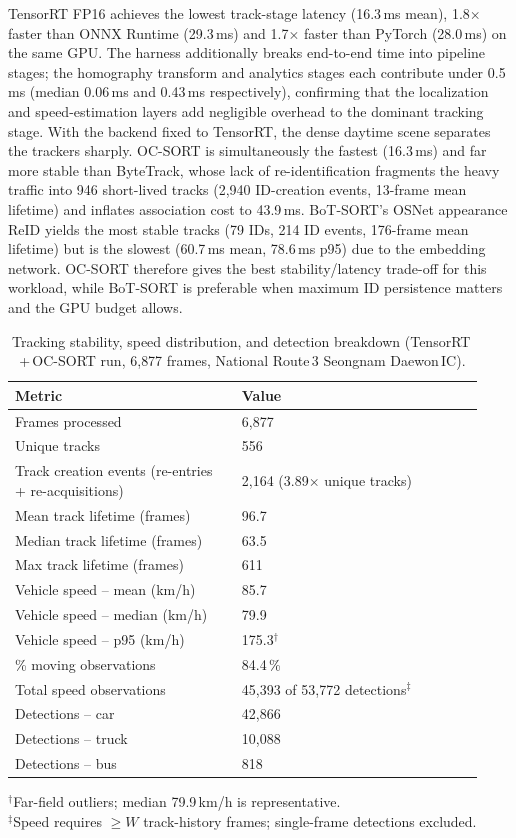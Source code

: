 \documentclass[conference]{IEEEtran}
\renewcommand{\_}{\textunderscore\allowbreak}
\begin{document}
TensorRT FP16 achieves the lowest track-stage latency (16.3\,ms mean), 1.8$\times$ faster
than ONNX Runtime (29.3\,ms) and 1.7$\times$ faster than PyTorch (28.0\,ms) on the same GPU.
The harness additionally breaks end-to-end time into pipeline stages; the homography
transform and analytics stages each contribute under 0.5\,ms (median 0.06\,ms and 0.43\,ms
respectively), confirming that the localization and speed-estimation layers add negligible
overhead to the dominant tracking stage. With the backend fixed to TensorRT, the dense
daytime scene separates the trackers sharply. OC-SORT is simultaneously the fastest
(16.3\,ms) and far more stable than ByteTrack, whose lack of re-identification fragments the
heavy traffic into 946 short-lived tracks (2{,}940 ID-creation events, 13-frame mean
lifetime) and inflates association cost to 43.9\,ms. BoT-SORT's OSNet appearance ReID yields
the most stable tracks (79 IDs, 214 ID events, 176-frame mean lifetime) but is the slowest
(60.7\,ms mean, 78.6\,ms p95) due to the embedding network. OC-SORT therefore gives the best
stability/latency trade-off for this workload, while BoT-SORT is preferable when maximum
ID persistence matters and the GPU budget allows.

\begin{table}[t]
\caption{Tracking stability, speed distribution, and detection breakdown
(TensorRT\,+\,OC-SORT run, 6{,}877 frames, National Route\,3 Seongnam Daewon\,IC).}
\label{tab:track}
\centering
\small
\begin{tabular}{@{}p{0.45\linewidth}p{0.48\linewidth}@{}}
\toprule
Metric & Value \\
\midrule
Frames processed              & 6{,}877 \\
Unique tracks                 & 556 \\
Track creation events (re-entries + re-acquisitions) & 2{,}164 (3.89$\times$ unique tracks) \\
Mean track lifetime (frames)  & 96.7 \\
Median track lifetime (frames) & 63.5 \\
Max track lifetime (frames)   & 611 \\
\midrule
Vehicle speed -- mean (km/h)  & 85.7 \\
Vehicle speed -- median (km/h) & 79.9 \\
Vehicle speed -- p95 (km/h)   & 175.3$^{\dagger}$ \\
\% moving observations        & 84.4\,\% \\
Total speed observations      & 45{,}393 of 53{,}772 detections$^{\ddagger}$ \\
\midrule
Detections -- car             & 42{,}866 \\
Detections -- truck           & 10{,}088 \\
Detections -- bus             & 818 \\
\bottomrule
\end{tabular}
\vspace{2pt}
{\footnotesize $^{\dagger}$Far-field outliers; median 79.9\,km/h is representative.\\
$^{\ddagger}$Speed requires ${\ge}W$ track-history frames; single-frame detections excluded.}
\end{table}
\end{document}
